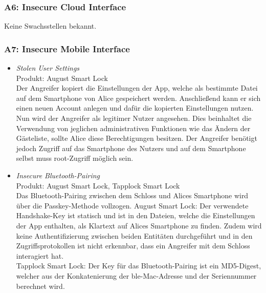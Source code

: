     \subsubsection*{A6: Insecure Cloud Interface}
        Keine Swachsstellen bekannt.
        
    \newpage    
    \subsubsection*{A7: Insecure Mobile Interface}
        \begin{itemize}[leftmargin=0cm,label={}]
            \item \emph{Stolen User Settings}\cite{Ye2017}\label{vuln:usersettings}\\
                Produkt: August Smart Lock\\ 
                Der Angreifer kopiert die Einstellungen der App, welche als bestimmte Datei auf dem Smartphone von Alice gespeichert werden.
    		    Anschließend kann er sich einen neuen Account anlegen und dafür die kopierten Einstellungen nutzen.
    		    Nun wird der Angreifer als legitimer Nutzer angesehen.
    		    Dies beinhaltet die Verwendung von jeglichen administrativen Funktionen wie das Ändern der Gästeliste, sollte Alice diese Berechtigungen besitzen.
    		    Der Angreifer benötigt jedoch Zugriff auf das Smartphone des Nutzers und auf dem Smartphone selbst muss root-Zugriff möglich sein.
		    \item \emph{Insecure Bluetooth-Pairing}\cite{Tierney2018,Rose2016,Ye2017,Fuller2017}\label{vuln:blepairing}\\
                Produkt: August Smart Lock, Tapplock Smart Lock\\
                Das Bluetooth-Pairing zwischen dem Schloss und Alices Smartphone wird über die Passkey-Methode vollzogen. 
                August Smart Lock: Der verwendete Handshake-Key ist statisch und ist in den Dateien, welche die Einstellungen der App enthalten, als Klartext auf Alices Smartphone zu finden. 
                Zudem wird keine Authentifizierung zwischen beiden Entitäten durchgeführt und in den Zugriffsprotokollen ist nicht erkennbar, dass ein Angreifer mit dem Schloss interagiert hat.\\
                Tapplock Smart Lock: Der Key für das Bluetooth-Pairing ist ein MD5-Digest, welcher aus der Konkatenierung der \gls{ble}-Mac-Adresse und der Seriennummer berechnet wird.
        \end{itemize}
        
